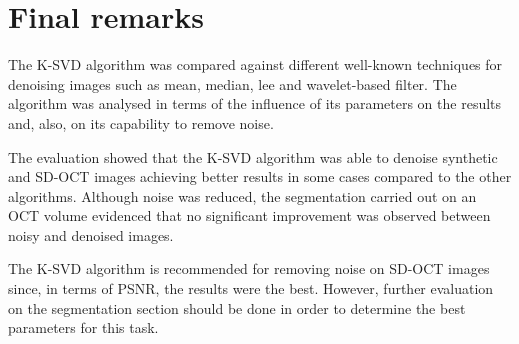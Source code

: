 \section{Final remarks} \label{sc:final-remarks}
The K-SVD algorithm was compared against different well-known techniques for denoising images such as mean, median, lee and wavelet-based filter. The algorithm was analysed in terms of the influence of its parameters on the results and, also, on its capability to remove noise.

The evaluation showed that the K-SVD algorithm was able to denoise synthetic and SD-OCT images achieving better results in some cases compared to the other algorithms.  Although noise was reduced, the segmentation carried out on an OCT volume evidenced that no significant improvement was observed between noisy and denoised images.

The K-SVD algorithm is recommended for removing noise on SD-OCT images since, in terms of PSNR, the results were the best. However, further evaluation on the segmentation section should be done in order to determine the best parameters for this task.
